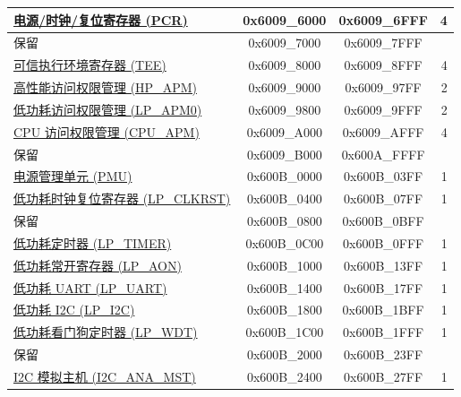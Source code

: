 \begin{ThreePartTable}
\begin{longtable}[c]{ |p{7cm}|c|c|r| }
    \hyperref[mod:resclk]{电源/时钟/复位寄存器 (PCR)}                     & 0x6009\_6000 & 0x6009\_6FFF &   4     \\\hline
        \rowcolor{gray!25}  保留                    & 0x6009\_7000 & 0x6009\_7FFF &         \\\hline
    \hyperref[mod:permctrl]{可信执行环境寄存器 (TEE)} \tnote{\textcolor{red}{2}}                     & 0x6009\_8000 & 0x6009\_8FFF &   4 \\\hline
    \hyperref[mod:permctrl]{高性能访问权限管理 (HP\_APM)}                      & 0x6009\_9000 & 0x6009\_97FF &   2 \\\hline
    \hyperref[mod:permctrl]{低功耗访问权限管理 (LP\_APM0)}                      & 0x6009\_9800 & 0x6009\_9FFF &  2  \\\hline
    \hyperref[mod:permctrl]{CPU 访问权限管理 (CPU\_APM)}                    & 0x6009\_A000 & 0x6009\_AFFF &    4     \\\hline                   
        \rowcolor{gray!25}  保留                    & 0x6009\_B000 & 0x600A\_FFFF &         \\\hline
    \hyperref[mod:lowpowm]{电源管理单元 (PMU)} & 0x600B\_0000 & 0x600B\_03FF &   1     \\\hline
    \hyperref[mod:resclk]{低功耗时钟复位寄存器 (LP\_CLKRST)}                  & 0x600B\_0400 & 0x600B\_07FF &   1     \\\hline
        \rowcolor{gray!25}  保留                    & 0x600B\_0800 & 0x600B\_0BFF &         \\\hline
    \hyperref[mod:lowpowm]{低功耗定时器 (LP\_TIMER)}                   & 0x600B\_0C00 & 0x600B\_0FFF &   1     \\\hline
    \hyperref[mod:sysreg]{低功耗常开寄存器 (LP\_AON)}                     & 0x600B\_1000 & 0x600B\_13FF &   1     \\\hline
    \hyperref[mod:uart]{低功耗 UART (LP\_UART)}                    & 0x600B\_1400 & 0x600B\_17FF &   1     \\\hline
    \hyperref[mod:i2c]{低功耗 I2C (LP\_I2C)}                     & 0x600B\_1800 & 0x600B\_1BFF &   1     \\\hline
    \hyperref[mod:wdt]{低功耗看门狗定时器 (LP\_WDT)}                     & 0x600B\_1C00 & 0x600B\_1FFF &   1     \\\hline
        \rowcolor{gray!25}  保留                    & 0x600B\_2000 & 0x600B\_23FF &         \\\hline
    \hyperref[mod:lowpowm]{I2C 模拟主机 (I2C\_ANA\_MST)}          
    & 0x600B\_2400 & 0x600B\_27FF &   1     \\\hline

\end{longtable}
\end{ThreePartTable}
